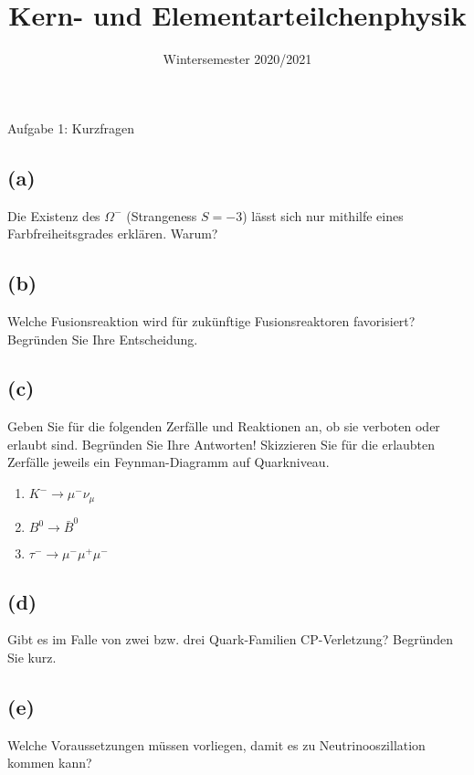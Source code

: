 

\subject{KET}
\title{Kern- und Elementarteilchenphysik}
\date{
    Wintersemester 2020/2021
}



\maketitle
\thispagestyle{empty}
\newpage


\begin{aufgabe}{Aufgabe 1: Kurzfragen}
    \subsection{(a)}
    Die Existenz des $\Omega^-$ (Strangeness $S = -3$) lässt sich nur mithilfe eines Farbfreiheitsgrades erklären.
    Warum?

    \subsection{(b)}
    Welche Fusionsreaktion wird für zukünftige Fusionsreaktoren favorisiert?
    Begründen Sie Ihre Entscheidung.
    \subsection{(c)}
    Geben Sie für die folgenden Zerfälle und Reaktionen an, ob sie verboten oder erlaubt sind.
    Begründen Sie Ihre Antworten!
    Skizzieren Sie für die erlaubten Zerfälle jeweils ein Feynman-Diagramm auf Quarkniveau.
    \begin{enumerate}
        \item $K^- \to \mu^- \nu_\mu$
        \item $B^0 \to \bar B^0$
        \item $\tau^- \to \mu^- \mu^+ \mu^-$
    \end{enumerate}

    \subsection{(d)}
    Gibt es im Falle von zwei bzw. drei Quark-Familien CP-Verletzung?
    Begründen Sie kurz.

    \subsection{(e)}
    Welche Voraussetzungen müssen vorliegen, damit es zu Neutrinooszillation kommen kann?


\end{aufgabe}
